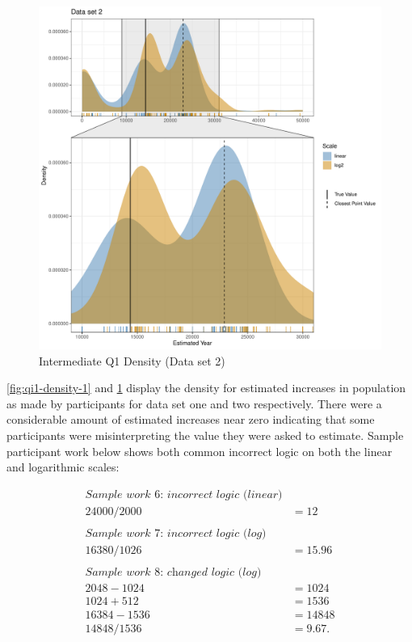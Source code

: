 \documentclass[print]{nuthesis}
\begin{document}
\begin{figure}[tbp]

{\centering \includegraphics[width=1\linewidth,]{thesis_files/figure-latex/qi1-density-2-1} 

}

\caption{Intermediate Q1 Density (Data set 2)}\label{fig:qi1-density-2}
\end{figure}

\cref{fig:qi1-density-1} and \cref{fig:qi1-density-2} display the density for estimated increases in population as made by participants for data set one and two respectively.
There were a considerable amount of estimated increases near zero indicating that some participants were misinterpreting the value they were asked to estimate.
Sample participant work below shows both common incorrect logic on both the linear and logarithmic scales:

\begin{align}
\textit{Sample work 6: incorrect logic (linear)} \nonumber\\
24000/2000&=12 \nonumber\\
\nonumber \\ 
\textit{Sample work 7: incorrect logic (log)} \nonumber\\
16380/1026&=15.96\nonumber\\
\nonumber \\ 
\textit{Sample work 8: changed logic (log)} \nonumber\\
2048-1024&=1024\nonumber\\
1024+512&=1536\nonumber\\
16384-1536&=14848\nonumber\\
14848/1536&=9.67.\nonumber
\end{align}
\end{document}
